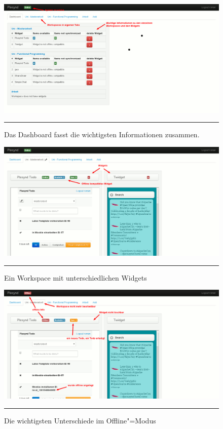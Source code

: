 \begin{figure}
  \centering
  \includegraphics[]{./Figures/plesynd_dashboard.png}
    \rule{35em}{0.5pt}
  \caption[Plesynd User"=Interface: Dashboard]{Das Dashboard fasst die wichtigsten Informationen zusammen.}
  \label{fig:plesynd_dashboard}
\end{figure}

\begin{figure}
  \centering
  \includegraphics[]{./Figures/plesynd_workspace_online.png}
    \rule{35em}{0.5pt}
  \caption[Plesynd User"=Interface: Workspace Online]{Ein Workspace mit unterschiedlichen Widgets}
  \label{fig:plesynd_workspace_online}
\end{figure}

\begin{figure}
  \centering
  \includegraphics[]{./Figures/plesynd_workspace_offline.png}
    \rule{35em}{0.5pt}
  \caption[Plesynd User"=Interface: Workspace Offline]{Die wichtigsten Unterschiede im Offline"=Modus}
  \label{fig:plesynd_workspace_offline}
\end{figure}

